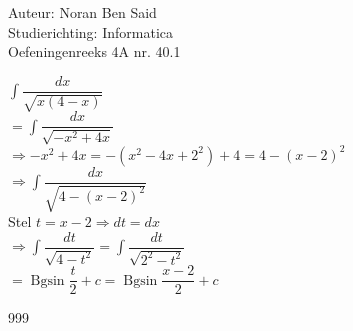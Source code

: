 \documentclass[a4paper]{article}
\newcommand{\Bgsin}{\operatorname{Bgsin}}
\begin{document}
\noindent \large Auteur: Noran Ben Said \\
\noindent \large Studierichting:  Informatica\\
\noindent \large Oefeningenreeks 4A nr. 40.1\\

\medskip

\normalsize


$\displaystyle\int \dfrac{dx}{\sqrt{x\left( 4-x \right) }}$\\

$= \displaystyle\int \dfrac{dx}{\sqrt{- x^2 + 4x}} $\\

$\Rightarrow - x^2 + 4x = - \left( x^2 -4x +2^2 \right) + 4 = 4 - \left(x-2 \right)^2 $\\

$\Rightarrow \displaystyle\int \dfrac{dx}{\sqrt{4 - \left(x -2 \right)^2}}$\\

Stel $t = x-2 \Rightarrow dt = dx  $\\

$\Rightarrow \displaystyle\int \dfrac{dt}{\sqrt{4 - t^2}} = \displaystyle\int \dfrac{dt}{\sqrt{2^2 - t^2}} $\\

$= \Bgsin \dfrac{t}{2} + c = \Bgsin \dfrac{x-2}{2} + c $\\

\begin{thebibliography}{999}
\end{thebibliography}
\end{document}
